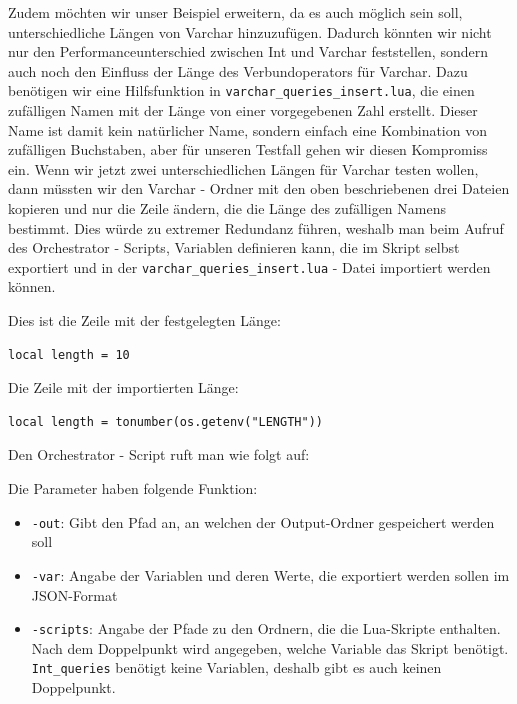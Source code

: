 Zudem möchten wir unser Beispiel erweitern, da es auch möglich sein soll, unterschiedliche Längen von Varchar hinzuzufügen.
Dadurch könnten wir nicht nur den Performanceunterschied zwischen Int und Varchar feststellen, sondern auch noch den Einfluss der Länge des Verbundoperators für Varchar.
Dazu benötigen wir eine Hilfsfunktion in \texttt{varchar\_queries\_insert.lua}, die einen zufälligen Namen mit der Länge von einer vorgegebenen Zahl erstellt.
Dieser Name ist damit kein natürlicher Name, sondern einfach eine Kombination von zufälligen Buchstaben, aber für unseren Testfall gehen wir diesen Kompromiss ein.
Wenn wir jetzt zwei unterschiedlichen Längen für Varchar testen wollen, dann müssten wir den Varchar - Ordner mit den oben beschriebenen drei Dateien kopieren und nur die Zeile ändern, die die Länge des zufälligen Namens bestimmt.
Dies würde zu extremer Redundanz führen, weshalb man beim Aufruf des Orchestrator - Scripts, Variablen definieren kann, die im Skript selbst exportiert und in der \texttt{varchar\_queries\_insert.lua} - Datei importiert werden können.

Dies ist die Zeile mit der festgelegten Länge:
\begin{lstlisting}[language={[5.0]Lua},label={lst:without_imported_length}]
local length = 10
\end{lstlisting}

Die Zeile mit der importierten Länge:
\begin{lstlisting}[language={[5.0]Lua},label={lst:with_imported_length}]
local length = tonumber(os.getenv("LENGTH"))
\end{lstlisting}

Den Orchestrator - Script ruft man wie folgt auf:


Die Parameter haben folgende Funktion:
\begin{itemize}[label=--]
    \item \texttt{-out}: Gibt den Pfad an, an welchen der Output-Ordner gespeichert werden soll
    \item \texttt{-var}: Angabe der Variablen und deren Werte, die exportiert werden sollen im JSON-Format
    \item \texttt{-scripts}: Angabe der Pfade zu den Ordnern, die die Lua-Skripte enthalten. Nach dem Doppelpunkt wird angegeben, welche Variable das Skript benötigt. \texttt{Int\_queries} benötigt keine Variablen, deshalb gibt es auch keinen Doppelpunkt.
\end{itemize}

